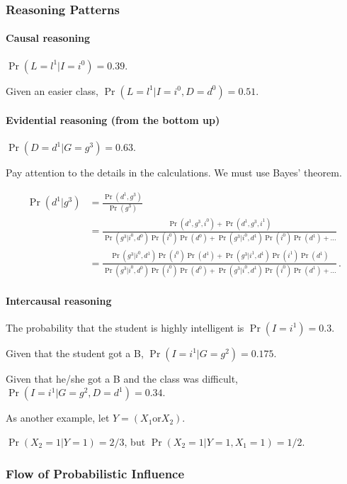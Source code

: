 \documentclass[12pt]{article}
\begin{document}

\subsubsection{Reasoning Patterns}
\paragraph{Causal reasoning}
$\Pr(L = l^1 | I = i^0) = 0.39$.

Given an easier class, $\Pr(L = l^1 | I = i^0, D = d^0) = 0.51$.

\paragraph{Evidential reasoning (from the bottom up)}
$\Pr(D = d^1 | G = g^3) = 0.63$.

Pay attention to the details in the calculations. We must use Bayes' theorem.

\begin{align*}
\Pr(d^1 | g^3) & = \frac{\Pr(d^1, g^3)}
                      {\Pr(g^3)} \\
               & = \frac{\Pr(d^1, g^3, i^0) + \Pr(d^1, g^3, i^1)}
                        {\Pr(g^3 | i^0, d^0) \Pr(i^0) \Pr(d^0) + \Pr(g^3 | i^0, d^1) \Pr(i^0) \Pr(d^1) + \ldots} \\
               & = \frac{\Pr(g^3 | i^0, d^1) \Pr(i^0) \Pr(d^1) + \Pr(g^3 | i^1, d^1) \Pr(i^1) \Pr(d^1)}
                        {\Pr(g^3 | i^0, d^0) \Pr(i^0) \Pr(d^0) + \Pr(g^3 | i^0, d^1) \Pr(i^0) \Pr(d^1) + \ldots} \, .
\end{align*}



\paragraph{Intercausal reasoning}

The probability that the student is highly intelligent is $\Pr(I = i^1) = 0.3$.

Given that the student got a B, $\Pr(I = i^1 | G = g^2) = 0.175$.

Given that he/she got a B and the class was difficult, $\Pr(I = i^1 | G = g^2, D = d^1) = 0.34$.


As another example, let $Y = (X_1 \text{or} X_2)$.

$\Pr(X_2 = 1 | Y = 1) = 2/3$, but $\Pr(X_2 = 1 | Y = 1, X_1 = 1) = 1/2$.


\subsubsection{Flow of Probabilistic Influence}
\end{document}
